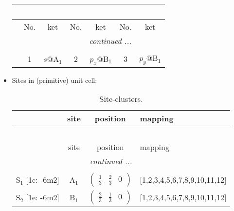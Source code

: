 \documentclass[fleqn,10pt,landscape]{article}
\begin{document}
\begin{itemize}
\begin{center}
\begin{longtable}{c|cc|cc|cc}
\multicolumn{6}{l}{\tablename\ \thetable{}} \\
 \hline \hline
 & No. & ket & No. & ket & No. & ket \\ \hline \endhead

 \hline \hline
\multicolumn{6}{r}{\footnotesize\it continued ...} \\ \endfoot

 \hline \hline
\multicolumn{6}{r}{} \\ \endlastfoot

 & 1 & $s$@A$_{1}$ & 2 & $p_{x}$@B$_{1}$ & 3 & $p_{y}$@B$_{1}$ \\
\end{longtable}
\end{center}

\item Sites in (primitive) unit cell:
\begin{center}
\renewcommand{\arraystretch}{1.3}
\begin{longtable}{cc|c|l}
\caption{Site-clusters.}
 \\
 \hline \hline
 & site & position & mapping \\ \hline \endfirsthead

\multicolumn{3}{l}{\tablename\ \thetable{}} \\
 \hline \hline
 & site & position & mapping \\ \hline \endhead

 \hline \hline
\multicolumn{3}{r}{\footnotesize\it continued ...} \\ \endfoot

 \hline \hline
\multicolumn{3}{r}{} \\ \endlastfoot

S$_{1}$ [1c: -6m2] & A$_1$ & $\begin{pmatrix} \frac{1}{3} & \frac{2}{3} & 0 \end{pmatrix}$ & [1,2,3,4,5,6,7,8,9,10,11,12] \\ \hline
S$_{2}$ [1e: -6m2] & B$_1$ & $\begin{pmatrix} \frac{2}{3} & \frac{1}{3} & 0 \end{pmatrix}$ & [1,2,3,4,5,6,7,8,9,10,11,12] \\
\end{longtable}
\end{center}


\end{itemize}
\end{document}
